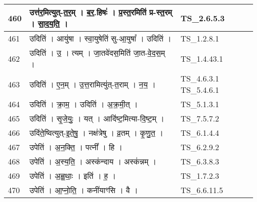 \documentclass[17pt]{extarticle}
\begin{document}
\begin{longtable}{||p{0.4in}||p{4.9in}||p{0.9in}||}
    \hline
        
    460 & उत्त॑र॒मित्युत्{-}त॒र॒म्   ।   ब॒र॒.हिषः॑   ।   प्र॒स्त॒रमिति॑ प्र{-}स्त॒रम्   ।   सा॒द॒य॒ति॒   ।    & TS\_2.6.5.3       \\
    
    \hline
        
    461 & उदिति॑   ।   आयु॑षा   ।   स्वा॒युषेति॑ सु{-}आ॒युषा᳚   ।   उदिति॑   ।    & TS\_1.2.8.1       \\
    
    \hline
        
    462 & उदिति॑   ।   उ॒   ।   त्यम्   ।   जा॒तवे॑दस॒मिति॑ जा॒त{-}वे॒द॒स॒म्   ।    & TS\_1.4.43.1       \\
    
    \hline
        
    463 & उदिति॑   ।   ए॒न॒म्   ।   उ॒त्त॒रामित्यु॑त्{-}त॒राम्   ।   न॒य॒   ।    & TS\_4.6.3.1 TS\_5.4.6.1       \\
    
    \hline
        
    464 & उदिति॑   ।   क्रा॒म॒   ।   उदिति॑   ।   अ॒क्र॒मी॒त्   ।    & TS\_5.1.3.1       \\
    
    \hline
        
    465 & उदिति॑   ।   सृ॒जे॒युः॒   ।   यत्   ।   आदि॑ष्ट॒मित्या{-}दि॒ष्ट॒म्   ।    & TS\_7.5.7.2       \\
    
    \hline
        
    466 & उदि॑ते॒ष्वित्युत्{-}इ॒ते॒षु॒   ।   नक्ष॑त्रेषु   ।   व्र॒तम्   ।   कृ॒णु॒त॒   ।    & TS\_6.1.4.4       \\
    
    \hline
        
    467 & उपेति॑   ।   अ॒न॒क्ति॒   ।   पत्नी᳚   ।   हि   ।    & TS\_6.2.9.2       \\
    
    \hline
        
    468 & उपेति॑   ।   अ॒स्य॒ति॒   ।   अस्क॑न्दाय   ।   अस्क॑न्नम्   ।    & TS\_6.3.8.3       \\
    
    \hline
        
    469 & उपेति॑   ।   अ॒ह्व॒थाः॒   ।   इति॑   ।   ह॒   ।    & TS\_1.7.2.3       \\
    
    \hline
        
    470 & उपेति॑   ।   आ॒प्नो॒ति॒   ।   कनी॑याꣳसि   ।   वै   ।    & TS\_6.6.11.5       \\
    

\end{longtable}
\end{document}
